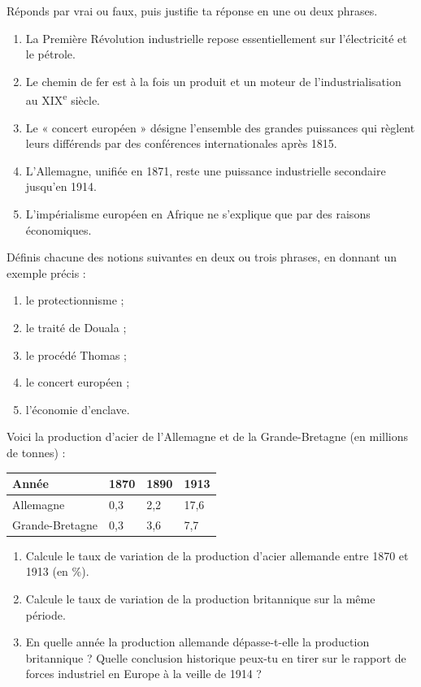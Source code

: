 \documentclass[11pt]{article}
\begin{document}
\begin{exercice}
Réponds par vrai ou faux, puis justifie ta réponse en une ou deux phrases.
\begin{enumerate}
\item La Première Révolution industrielle repose essentiellement sur l'électricité et le pétrole.
\item Le chemin de fer est à la fois un produit et un moteur de l'industrialisation au XIX\textsuperscript{e} siècle.
\item Le « concert européen » désigne l'ensemble des grandes puissances qui règlent leurs différends par des conférences internationales après 1815.
\item L'Allemagne, unifiée en 1871, reste une puissance industrielle secondaire jusqu'en 1914.
\item L'impérialisme européen en Afrique ne s'explique que par des raisons économiques.
\end{enumerate}
\end{exercice}

\begin{exercice}[Définitions]
Définis chacune des notions suivantes en deux ou trois phrases, en donnant un exemple précis :
\begin{enumerate}
\item le protectionnisme ;
\item le traité de Douala ;
\item le procédé Thomas ;
\item le concert européen ;
\item l'économie d'enclave.
\end{enumerate}
\end{exercice}

\begin{exercice}
Voici la production d'acier de l'Allemagne et de la Grande-Bretagne (en millions de tonnes) :
\begin{center}
\begin{tabularx}{\linewidth}{|l|X|X|X|}\hline
\rowcolor{popblueL} Année & 1870 & 1890 & 1913 \\ \hline
Allemagne & 0,3 & 2,2 & 17,6 \\ \hline
Grande-Bretagne & 0,3 & 3,6 & 7,7 \\ \hline
\end{tabularx}
\end{center}
\begin{enumerate}
\item Calcule le taux de variation de la production d'acier allemande entre 1870 et 1913 (en \%).
\item Calcule le taux de variation de la production britannique sur la même période.
\item En quelle année la production allemande dépasse-t-elle la production britannique ? Quelle conclusion historique peux-tu en tirer sur le rapport de forces industriel en Europe à la veille de 1914 ?
\end{enumerate}
\end{exercice}
\end{document}
